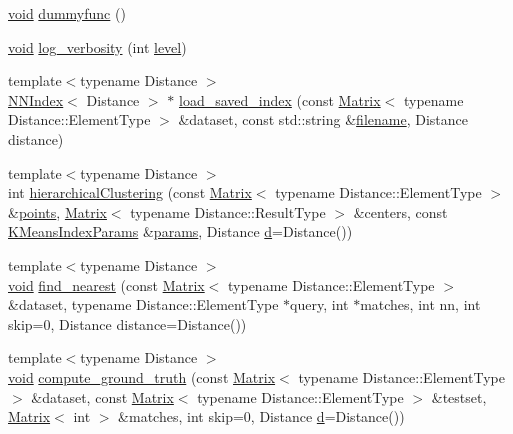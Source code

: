 \begin{DoxyCompactItemize}
\item 
\hyperlink{legacy_8hpp_a8bb47f092d473522721002c86c13b94e}{void} \hyperlink{namespacecvflann_ae9994e52487681dad1cd4ce9616a0a7c}{dummyfunc} ()
\item 
\hyperlink{legacy_8hpp_a8bb47f092d473522721002c86c13b94e}{void} \hyperlink{namespacecvflann_a18e2246e157b9d5de30894e1721c4154}{log\-\_\-verbosity} (int \hyperlink{tracking_8hpp_ac693e272fb1883fe0343f55a14d72b22}{level})
\item 
{\footnotesize template$<$typename Distance $>$ }\\\hyperlink{classcvflann_1_1NNIndex}{N\-N\-Index}$<$ Distance $>$ $\ast$ \hyperlink{namespacecvflann_ad7e1b31108d64c74c249eae0ff3b5e4e}{load\-\_\-saved\-\_\-index} (const \hyperlink{classcvflann_1_1Matrix}{Matrix}$<$ typename Distance\-::\-Element\-Type $>$ \&dataset, const std\-::string \&\hyperlink{core__c_8h_acc427f35f3bd9f865d39012657cc42f8}{filename}, Distance distance)
\item 
{\footnotesize template$<$typename Distance $>$ }\\int \hyperlink{namespacecvflann_aa43d8d0d11bb830e96fe73c5984bf6d0}{hierarchical\-Clustering} (const \hyperlink{classcvflann_1_1Matrix}{Matrix}$<$ typename Distance\-::\-Element\-Type $>$ \&\hyperlink{legacy_8hpp_a8c4b676395bf614cc92b782d12f18847}{points}, \hyperlink{classcvflann_1_1Matrix}{Matrix}$<$ typename Distance\-::\-Result\-Type $>$ \&centers, const \hyperlink{structcvflann_1_1KMeansIndexParams}{K\-Means\-Index\-Params} \&\hyperlink{compat_8hpp_a0480a03ecc41b20cde376602531d9270}{params}, Distance \hyperlink{legacy_8hpp_a6f364afbe132c4ecfea48bde1b0618ba}{d}=Distance())
\item 
{\footnotesize template$<$typename Distance $>$ }\\\hyperlink{legacy_8hpp_a8bb47f092d473522721002c86c13b94e}{void} \hyperlink{namespacecvflann_a4cef5e2bfb3a079ecf51ed03d390165c}{find\-\_\-nearest} (const \hyperlink{classcvflann_1_1Matrix}{Matrix}$<$ typename Distance\-::\-Element\-Type $>$ \&dataset, typename Distance\-::\-Element\-Type $\ast$query, int $\ast$matches, int nn, int skip=0, Distance distance=Distance())
\item 
{\footnotesize template$<$typename Distance $>$ }\\\hyperlink{legacy_8hpp_a8bb47f092d473522721002c86c13b94e}{void} \hyperlink{namespacecvflann_ac1c39b8cc8c815ab7e018c4a5039650d}{compute\-\_\-ground\-\_\-truth} (const \hyperlink{classcvflann_1_1Matrix}{Matrix}$<$ typename Distance\-::\-Element\-Type $>$ \&dataset, const \hyperlink{classcvflann_1_1Matrix}{Matrix}$<$ typename Distance\-::\-Element\-Type $>$ \&testset, \hyperlink{classcvflann_1_1Matrix}{Matrix}$<$ int $>$ \&matches, int skip=0, Distance \hyperlink{legacy_8hpp_a6f364afbe132c4ecfea48bde1b0618ba}{d}=Distance())

\end{DoxyCompactItemize}
